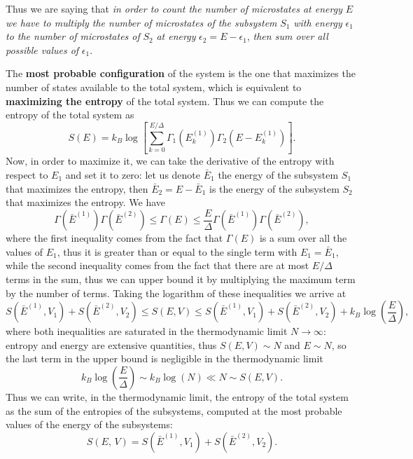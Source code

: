 Thus we are saying that \textit{in order to count the number of microstates at energy} \(E\) \textit{we have to multiply the number of microstates of the subsystem} \(S_1\) \textit{with energy} \(\epsilon_1\) \textit{to the number of microstates of} \(S_2\) \textit{at energy} \(\epsilon_2 = E - \epsilon_1\), \textit{then sum over all possible values of} \(\epsilon_1\).

The \textbf{most probable configuration} of the system is the one that maximizes the number of states available to the total system, which is equivalent to \textbf{maximizing the entropy} of the total system. Thus we can compute the entropy of the total system as
\[
    S(E) = k_B \log \left[ \sum_{k=0}^{E/\Delta} \Gamma_1(E_k^{(1)}) \Gamma_2(E-E_k^{(1)}) \right].
\]
Now, in order to maximize it, we can take the derivative of the entropy with respect to \(E_1\) and set it to zero: let us denote \(\bar{E}_1\) the energy of the subsystem \(S_1\) that maximizes the entropy, then \(\bar{E}_2 = E - \bar{E}_1\) is the energy of the subsystem \(S_2\) that maximizes the entropy. We have
\[
    \Gamma(\bar{E}^{(1)})\Gamma(\bar{E}^{(2)}) \leq \Gamma(E) \leq \frac{E}{\Delta} \Gamma(\bar{E}^{(1)})\Gamma(\bar{E}^{(2)}),
\]
where the first inequality comes from the fact that \(\Gamma(E)\) is a sum over all the values of \(E_1\), thus it is greater than or equal to the single term with \(E_1 = \bar{E}_1\), while the second inequality comes from the fact that there are at most \(E/\Delta\) terms in the sum, thus we can upper bound it by multiplying the maximum term by the number of terms. Taking the logarithm of these inequalities we arrive at
\[
    S(\bar{E}^{(1)}, V_1) + S(\bar{E}^{(2)}, V_2) \leq S(E, V) \leq S(\bar{E}^{(1)}, V_1) + S(\bar{E}^{(2)}, V_2) + k_B \log \left( \frac{E}{\Delta} \right),
\]
where both inequalities are saturated in the thermodynamic limit \(N \to \infty\): entropy and energy are extensive quantities, thus \(S(E, V) \sim N\) and \(E \sim N\), so the last term in the upper bound is negligible in the thermodynamic limit
\[
    k_B \log\left(\frac{E}{\Delta}\right) \sim k_B \log(N) \ll N \sim S(E, V).
\]
Thus we can write, in the thermodynamic limit, the entropy of the total system as the sum of the entropies of the subsystems, computed at the most probable values of the energy of the subsystems:
\[
    S(E,\,V) = S(\bar{E}^{(1)}, V_1) + S(\bar{E}^{(2)}, V_2).
\]

